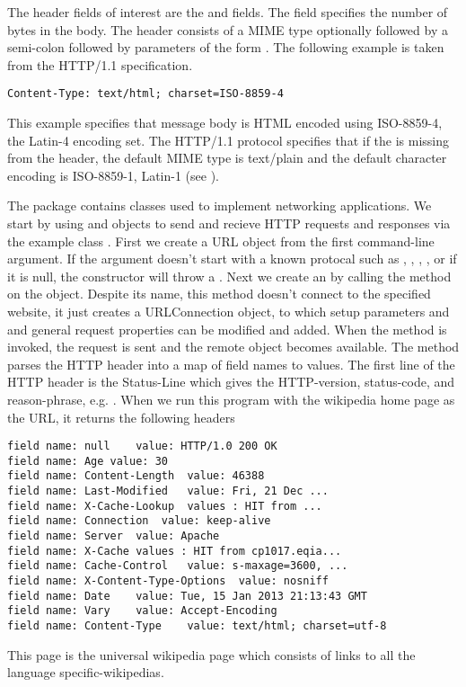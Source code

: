 The header fields of interest are the  and  fields.
The  field specifies the number of bytes in the body.
The  header consists of a MIME type optionally followed by 
a semi-colon followed by parameters of the form .
The following example is taken from the HTTP/1.1 specification.
\begin{verbatim}
Content-Type: text/html; charset=ISO-8859-4
\end{verbatim}
This example specifies that message body is HTML encoded using
ISO-8859-4, the Latin-4 encoding set.
The HTTP/1.1 protocol specifies that if the  is missing from the header,
the default MIME type is text/plain and the default
character encoding is ISO-8859-1, Latin-1 (see ).

The  package contains classes used to implement networking applications.
We start by using  and  objects
to send and recieve HTTP requests and responses via the example class .
%
%
%
First we create a URL object from the first command-line argument.
If the argument doesn't start with a known protocal such as
, , , , or if it is null,
the constructor will throw a .
Next we create an  by calling the 
method on the  object.
Despite its name, this method doesn't connect to the specified website, it just
creates a URLConnection object, to which setup parameters and and general 
request properties can be modified and added.
When the  method is invoked, the request is sent and the remote object
becomes available.  
%
%
The method  parses the HTTP header into a map of
field names to values.
The first line of the HTTP header is the Status-Line which gives the
HTTP-version, status-code, and  reason-phrase, e.g.
.
When we run this program with the wikipedia home page as the URL,
it returns the following headers
%
\begin{verbatim} 
field name: null	value: HTTP/1.0 200 OK 
field name: Age	value: 30
field name: Content-Length	value: 46388
field name: Last-Modified	value: Fri, 21 Dec ...
field name: X-Cache-Lookup	values : HIT from ...
field name: Connection	value: keep-alive
field name: Server	value: Apache
field name: X-Cache	values : HIT from cp1017.eqia...
field name: Cache-Control	value: s-maxage=3600, ...
field name: X-Content-Type-Options	value: nosniff
field name: Date	value: Tue, 15 Jan 2013 21:13:43 GMT
field name: Vary	value: Accept-Encoding
field name: Content-Type	value: text/html; charset=utf-8
\end{verbatim}
%
This page is the universal wikipedia page which consists of links to all
the language specific-wikipedias.

